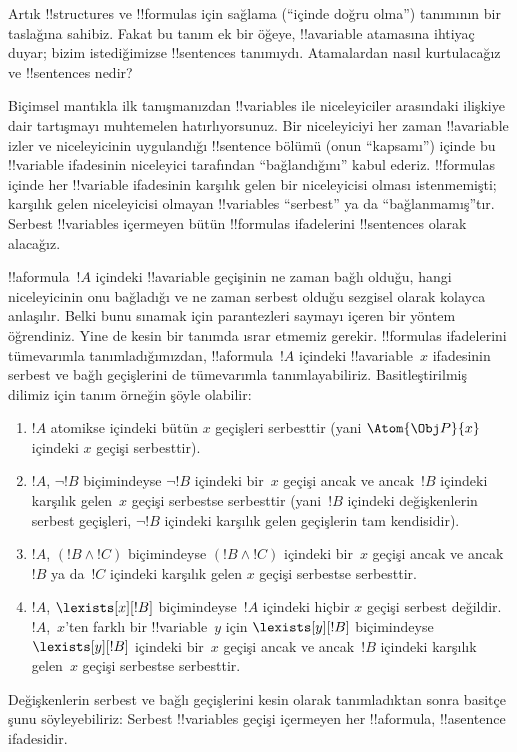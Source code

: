



Artık !!{structure}s ve !!{formula}s için sağlama (``içinde doğru
olma'') tanımının bir taslağına sahibiz. Fakat bu tanım ek bir öğeye,
!!a{variable} atamasına ihtiyaç duyar; bizim istediğimizse
!!{sentence}s tanımıydı. Atamalardan nasıl kurtulacağız ve
!!{sentence}s nedir?

Biçimsel mantıkla ilk tanışmanızdan !!{variable}s ile niceleyiciler
arasındaki ilişkiye dair tartışmayı muhtemelen hatırlıyorsunuz. Bir
niceleyiciyi her zaman !!a{variable} izler ve niceleyicinin uygulandığı
!!{sentence} bölümü (onun ``kapsamı'') içinde bu !!{variable}
ifadesinin niceleyici tarafından ``bağlandığını'' kabul ederiz.
!!{formula}s içinde her !!{variable} ifadesinin karşılık gelen bir
niceleyicisi olması istenmemişti; karşılık gelen niceleyicisi olmayan
!!{variable}s ``serbest'' ya da ``bağlanmamış''tır. Serbest
!!{variable}s içermeyen bütün !!{formula}s ifadelerini !!{sentence}s
olarak alacağız.

!!a{formula}~$!A$ içindeki !!a{variable} geçişinin ne zaman bağlı
olduğu, hangi niceleyicinin onu bağladığı ve ne zaman serbest olduğu
sezgisel olarak kolayca anlaşılır. Belki bunu sınamak için parantezleri
saymayı içeren bir yöntem öğrendiniz. Yine de kesin bir tanımda ısrar
etmemiz gerekir. !!{formula}s ifadelerini tümevarımla tanımladığımızdan,
!!a{formula}~$!A$ içindeki !!a{variable}~$x$ ifadesinin serbest ve
bağlı geçişlerini de tümevarımla tanımlayabiliriz. Basitleştirilmiş
dilimiz için tanım örneğin şöyle olabilir:
\begin{enumerate}
  \item $!A$ atomikse içindeki bütün $x$ geçişleri serbesttir (yani
  $\Atom{\Obj P}{x}$ içindeki $x$ geçişi serbesttir).
  \item $!A$, $\lnot !B$ biçimindeyse $\lnot !B$ içindeki bir~$x$
  geçişi ancak ve ancak~$!B$ içindeki karşılık gelen~$x$ geçişi
  serbestse serbesttir (yani~$!B$ içindeki değişkenlerin serbest
  geçişleri, $\lnot !B$ içindeki karşılık gelen geçişlerin tam
  kendisidir).
  \item $!A$, $(!B\land !C)$ biçimindeyse $(!B\land !C)$ içindeki
  bir~$x$ geçişi ancak ve ancak~$!B$ ya da~$!C$ içindeki karşılık gelen
  $x$ geçişi serbestse serbesttir.
  \item $!A$, $\lexists[x][!B]$ biçimindeyse~$!A$ içindeki hiçbir
  $x$ geçişi serbest değildir. $!A$,~$x$'ten farklı bir
  !!{variable}~$y$ için $\lexists[y][!B]$ biçimindeyse
  $\lexists[y][!B]$ içindeki bir~$x$ geçişi ancak ve ancak~$!B$
  içindeki karşılık gelen~$x$ geçişi serbestse serbesttir.
\end{enumerate}

Değişkenlerin serbest ve bağlı geçişlerini kesin olarak tanımladıktan
sonra basitçe şunu söyleyebiliriz: Serbest !!{variable}s geçişi
içermeyen her !!a{formula}, !!a{sentence} ifadesidir.

